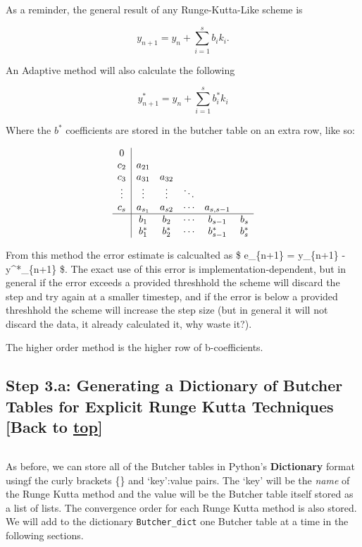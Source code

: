 \documentclass[landscape,letterpaper,10pt,english]{article}
\begin{document}
As a reminder, the general result of any Runge-Kutta-Like scheme is

\[y_{n+1} = y_n + \sum_{i=1}^s b_ik_i. \]

An Adaptive method will also calculate the following

\[y^*_{n+1} = y_n + \sum_{i=1}^s b^*_ik_i \]

Where the \(b^*\) coefficients are stored in the butcher table on an
extra row, like so:

\[\begin{array}{c|ccccc}
    0 & \\
    c_2 & a_{21} & \\
    c_3 & a_{31} & a_{32} & \\
    \vdots & \vdots & \vdots & \ddots \\
    c_s & a_{s_1} & a_{s2} & \cdots & a_{s,s-1} \\ \hline 
     & b_1 & b_2 & \cdots & b_{s-1} & b_s \\
     & b^*_1 & b^*_2 & \cdots & b^*_{s-1} & b^*_s \\
\end{array} \]

From this method the error estimate is calcualted as \$ e\_\{n+1\} =
y\_\{n+1\} - y\^{}*\_\{n+1\} \$. The exact use of this error is
implementation-dependent, but in general if the error exceeds a provided
threshhold the scheme will discard the step and try again at a smaller
timestep, and if the error is below a provided threshhold the scheme
will increase the step size (but in general it will not discard the
data, it already calculated it, why waste it?).

The higher order method is the higher row of b-coefficients.

    \hypertarget{step-3.a-generating-a-dictionary-of-butcher-tables-for-explicit-runge-kutta-techniques-back-to-top}{%
\subsection{\texorpdfstring{Step 3.a: Generating a Dictionary of Butcher
Tables for Explicit Runge Kutta Techniques {[}Back to
\hyperref[toc]{top}{]}}{Step 3.a: Generating a Dictionary of Butcher Tables for Explicit Runge Kutta Techniques {[}Back to {]}}}\label{step-3.a-generating-a-dictionary-of-butcher-tables-for-explicit-runge-kutta-techniques-back-to-top}}

\[\label{codebutchera}\]

As before, we can store all of the Butcher tables in Python's
\textbf{Dictionary} format usingf the curly brackets \{\} and
`key':value pairs. The `key' will be the \emph{name} of the Runge Kutta
method and the value will be the Butcher table itself stored as a list
of lists. The convergence order for each Runge Kutta method is also
stored. We will add to the dictionary \texttt{Butcher\_dict} one Butcher
table at a time in the following sections.
\end{document}
